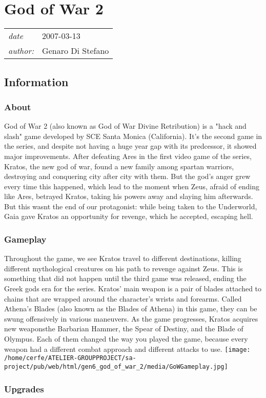 \documentclass[a4paper,10pt]{book}
\newcommand{\pageHeader}[4]{
    \section{#1}
    \vspace{-0.3cm}
    \begin{table}[h!]
     \begin{tabular}{ll}
        \hline
        \textit{date} & #2 \\
        \textit{author: } & #3\\
        \hline
     \end{tabular}
    \end{table}
    \vspace{-0.3cm}
}
\begin{document}
 
 \newpage\pageHeader{God of War 2}{2007-03-13}{Genaro Di Stefano}{One of the best hack and slash in history}
 \subsection{Information }
 \subsubsection{About }
 
          God of War 2 (also known as God of War Divine Retribution) is a "hack and slash" game developed by SCE Santa Monica (California). It's the second game in the series, and despite not having a huge year gap with its predcessor, it showed major improvements.    
          After defeating Ares in the first video game of the series, Kratos, the new god of war, found a new family among spartan warriors, destroying and conquering city after city with them. But the god's anger grew every time this happened, which lead to the moment when Zeus, afraid of ending like Ares, betrayed Kratos, taking his powers away and slaying him afterwards. But this wasnt the end of our protagonist: while being taken to the Underworld, Gaia gave Kratos an opportunity for revenge, which he accepted, escaping hell.
           
 \subsubsection{Gameplay }
 
          Throughout the game, we see Kratos travel to different destinations, killing different mythological creatures on his path to revenge against Zeus. This is something that did not happen until the third game was released, ending the Greek gods era for the series.
 Kratos' main weapon is a pair of blades attached to chains that are wrapped around the character's wrists and forearms. Called Athena's Blades (also known as the Blades of Athena) in this game, they can be swung offensively in various maneuvers. As the game progresses, Kratos acquires new weaponsthe Barbarian Hammer, the Spear of Destiny, and the Blade of Olympus. Each of them changed the way you played the game, because every weapon had a different combat approach and different attacks to use.
  \texttt{[image: /home/cerfe/ATELIER-GROUPPROJECT/sa-project/pub/web/html/gen6\_god\_of\_war\_2/media/GoWGameplay.jpg]}
 
 
 \subsubsection{Upgrades }
\end{document}
